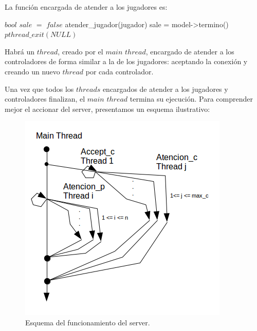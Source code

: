 La función encargada de atender a los jugadores es:

\begin{algorithmic}
	\State $bool$ $sale$ $=$ $false$ 
		\State atender\_jugador(jugador)
		\State sale = model->termino()
	\EndWhile
	\State $pthread\_exit(NULL)$
  \EndFunction
\end{algorithmic}

Habrá un $thread$, creado por el $main$ $thread$, encargado de atender a los controladores de forma similar a la de los jugadores: aceptando la conexión y creando un nuevo $thread$ por cada controlador.

Una vez que todos los $threads$ encargados de atender a los jugadores y controladores finalizan, el $main$ $thread$ termina su ejecución. Para comprender mejor el accionar del server, presentamos un esquema ilustrativo:


\begin{figure}[H]
\centering\includegraphics[scale=0.7]{imgs/server.png}
\caption{Esquema del funcionamiento del server.}
\end{figure}

